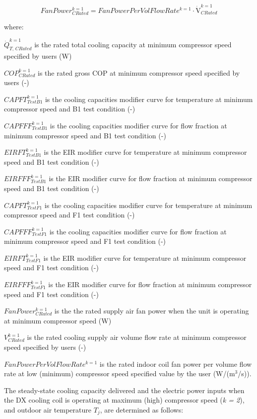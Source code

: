 \begin{equation}
FanPower_{CRated}^{k = 1} = FanPowerPerVolFlowRat{e^{k = 1}} \cdot {\mathrm{\dot V}}_{CRated}^{k = 1}
\end{equation}

where:

\(\dot Q_{T,\,CRated}^{k = 1}\) is the rated total cooling capacity at minimum compressor speed specified by users (W)

\(COP_{CRated}^{k = 1}\) is the rated gross COP at minimum compressor speed specified by users (-)

\(CAPFT_{TestB1}^{k = 1}\) is the cooling capacities modifier curve for temperature at minimum compressor speed and B1 test condition (-)

\(CAPFFF_{TestB1}^{k = 1}\) is the cooling capacities modifier curve for flow fraction at minimum compressor speed and B1 test condition (-)

\(EIRFT_{TestB1}^{k = 1}\) is the EIR modifier curve for temperature at minimum compressor speed and B1 test condition (-)

\(EIRFFF_{TestB1}^{k = 1}\) is the EIR modifier curve for flow fraction at minimum compressor speed and B1 test condition (-)

\(CAPFT_{TestF1}^{k = 1}\) is the cooling capacities modifier curve for temperature at minimum compressor speed and F1 test condition (-)

\(CAPFFF_{TestF1}^{k = 1}\) is the cooling capacities modifier curve for flow fraction at minimum compressor speed and F1 test condition (-)

\(EIRFT_{TestF1}^{k = 1}\) is the EIR modifier curve for temperature at minimum compressor speed and F1 test condition (-)

\(EIRFFF_{TestF1}^{k = 1}\) is the EIR modifier curve for flow fraction at minimum compressor speed and F1 test condition (-)

\(FanPower_{CRated}^{k = 1}\) is the the rated supply air fan power when the unit is operating at minimum compressor speed (W)

\(V_{CRated}^{k = 1}\) is the rated cooling supply air volume flow rate at minimum compressor speed specified by users (-)

\(FanPowerPerVolFlowRat{e^{k = 1}}\) is the rated indoor coil fan power per volume flow rate at low (minimum) compressor speed specified value by the user (W/(m\(^3\)/s)).

The steady-state cooling capacity delivered and the electric power inputs when the DX cooling coil is operating at maximum (high) compressor speed (\emph{k = 2}), and outdoor air temperature \(T_{j}\), are determined as follows:

